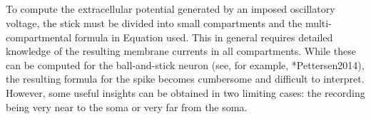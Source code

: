 %

\subsection{}
\label{sec:Spikes:approximate}
To compute the extracellular potential generated by an imposed oscillatory voltage, the stick must be divided into small compartments and the multi-compartmental formula in Equation  used.  This in general requires detailed knowledge of the resulting membrane currents in all compartments. While these can be computed for the ball-and-stick neuron (see, for example, \citeasnoun**{Pettersen2014}), the resulting formula for the spike becomes cumbersome and difficult to interpret.  However, some useful insights can be obtained in two limiting cases: the recording being very near to the soma or very far from the soma.


%

